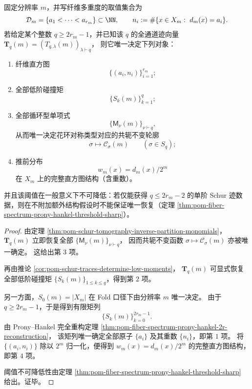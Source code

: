 \begin{theorem}\label{thm:pom-single-q-schur-traces-complete-fiber-spectrum}
固定分辨率 \(m\)，并写纤维多重度的取值集合为
\[
\mathcal{D}_m=\{a_1<\cdots<a_{r_m}\}\subset\NN,
\qquad
n_i:=\#\{x\in X_m:\ d_m(x)=a_i\}.
\]
若给定某个整数 \(q\ge 2r_m-1\)，并已知该 \(q\) 的全通道迹向量
\(
\mathbf T_q(m)=(T_{q,\lambda}(m))_{\lambda\vdash q}
\)，
则它唯一决定下列对象：
\begin{enumerate}
  \item 纤维直方图
  \[
  \{(a_i,n_i)\}_{i=1}^{r_m};
  \]
  \item 全部低阶碰撞矩
  \[
  \{S_k(m)\}_{k=1}^{q};
  \]
  \item 全部循环型单项式
  \[
  \{\mathsf{M}_\nu(m)\}_{\nu\vdash q},
  \]
  从而唯一决定花环对称类型对应的共轭不变轮廓
  \[
  \sigma\longmapsto \mathcal C_\sigma(m)
  \qquad(\sigma\in S_q);
  \]
  \item 推前分布
  \[
  w_m(x)=d_m(x)/2^m
  \]
  在 \(X_m\) 上的完整直方图结构（含重数）。
\end{enumerate}
并且该阈值在一般意义下不可降低：若仅能获得 \(q\le 2r_m-2\) 的单阶 Schur 迹数据，则在不附加额外结构假设时不能保证唯一恢复（定理 \ref{thm:pom-fiber-spectrum-prony-hankel-threshold-sharp}）。
\end{theorem}
\begin{proof}
由定理 \ref{thm:pom-schur-tomography-inverse-partition-monomials}，
\(\mathbf T_q(m)\) 立即恢复全部 \(\{\mathsf M_\nu(m)\}_{\nu\vdash q}\)，
因而共轭不变函数 \(\sigma\mapsto \mathcal C_\sigma(m)\) 亦被唯一确定。
这给出第 \(3\) 项。

再由推论 \ref{cor:pom-schur-traces-determine-low-moments}，
\(\mathbf T_q(m)\) 可显式恢复全部低阶碰撞矩 \(\{S_k(m)\}_{1\le k\le q}\)，得到第 \(2\) 项。

另一方面，\(S_0(m)=|X_m|\) 在 Fold 口径下由分辨率 \(m\) 唯一决定。
由于 \(q\ge 2r_m-1\)，于是得到有限矩列
\[
\{S_k(m)\}_{k=0}^{2r_m-1}.
\]
由 Prony--Hankel 完全重构定理 \ref{thm:pom-fiber-spectrum-prony-hankel-2r-reconstruction}，
该矩列唯一确定全部原子 \(\{a_i\}\) 及其重数 \(\{n_i\}\)，即第 \(1\) 项。
将 \(\{(a_i,n_i)\}\) 除以 \(2^m\) 归一化，便得到 \(w_m(x)=d_m(x)/2^m\) 的完整直方图结构，即第 \(4\) 项。

阈值不可降低性由定理 \ref{thm:pom-fiber-spectrum-prony-hankel-threshold-sharp} 给出。证毕。
\end{proof}



